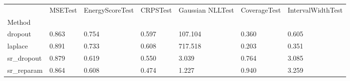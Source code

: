 \begin{tabular}{lllllll}
\toprule
 & MSETest & EnergyScoreTest & CRPSTest & Gaussian NLLTest & CoverageTest & IntervalWidthTest \\
Method &  &  &  &  &  &  \\
\midrule
dropout & 0.863 & 0.754 & 0.597 & 107.104 & 0.360 & 0.605 \\
laplace & 0.891 & 0.733 & 0.608 & 717.518 & 0.203 & 0.351 \\
sr_dropout & 0.879 & 0.619 & 0.550 & 3.039 & 0.764 & 3.085 \\
sr_reparam & 0.864 & 0.608 & 0.474 & 1.227 & 0.940 & 3.259 \\
\bottomrule
\end{tabular}
